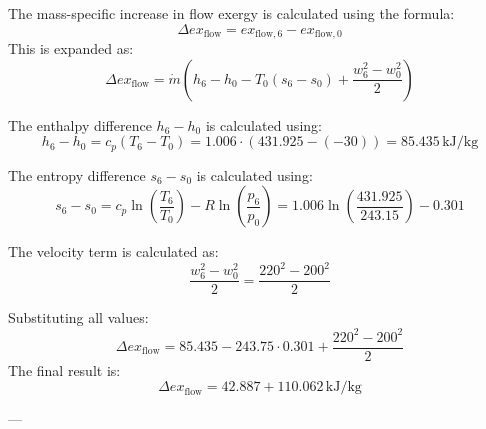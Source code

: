 The mass-specific increase in flow exergy is calculated using the formula:  
\[
\Delta ex_{\text{flow}} = ex_{\text{flow},6} - ex_{\text{flow},0}
\]  
This is expanded as:  
\[
\Delta ex_{\text{flow}} = \dot{m} \left( h_6 - h_0 - T_0 (s_6 - s_0) + \frac{w_6^2 - w_0^2}{2} \right)
\]  

The enthalpy difference \( h_6 - h_0 \) is calculated using:  
\[
h_6 - h_0 = c_p (T_6 - T_0) = 1.006 \cdot (431.925 - (-30)) = 85.435 \, \text{kJ/kg}
\]  

The entropy difference \( s_6 - s_0 \) is calculated using:  
\[
s_6 - s_0 = c_p \ln \left( \frac{T_6}{T_0} \right) - R \ln \left( \frac{p_6}{p_0} \right) = 1.006 \ln \left( \frac{431.925}{243.15} \right) - 0.301
\]  

The velocity term is calculated as:  
\[
\frac{w_6^2 - w_0^2}{2} = \frac{220^2 - 200^2}{2}
\]  

Substituting all values:  
\[
\Delta ex_{\text{flow}} = 85.435 - 243.75 \cdot 0.301 + \frac{220^2 - 200^2}{2}
\]  
The final result is:  
\[
\Delta ex_{\text{flow}} = 42.887 + 110.062 \, \text{kJ/kg}
\]  

---